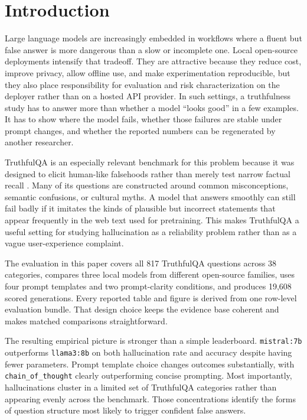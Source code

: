 \documentclass[conference]{IEEEtran}
\begin{document}
\section{\textbf{Introduction}}

Large language models are increasingly embedded in workflows where a fluent but false answer is more dangerous than a slow or incomplete one. Local open-source deployments intensify that tradeoff. They are attractive because they reduce cost, improve privacy, allow offline use, and make experimentation reproducible, but they also place responsibility for evaluation and risk characterization on the deployer rather than on a hosted API provider. In such settings, a truthfulness study has to answer more than whether a model ``looks good'' in a few examples. It has to show where the model fails, whether those failures are stable under prompt changes, and whether the reported numbers can be regenerated by another researcher.

TruthfulQA is an especially relevant benchmark for this problem because it was designed to elicit human-like falsehoods rather than merely test narrow factual recall \cite{truthfulqa}. Many of its questions are constructed around common misconceptions, semantic confusions, or cultural myths. A model that answers smoothly can still fail badly if it imitates the kinds of plausible but incorrect statements that appear frequently in the web text used for pretraining. This makes TruthfulQA a useful setting for studying hallucination as a reliability problem rather than as a vague user-experience complaint.

The evaluation in this paper covers all 817 TruthfulQA questions across 38 categories, compares three local models from different open-source families, uses four prompt templates and two prompt-clarity conditions, and produces 19,608 scored generations. Every reported table and figure is derived from one row-level evaluation bundle. That design choice keeps the evidence base coherent and makes matched comparisons straightforward.

The resulting empirical picture is stronger than a simple leaderboard. \texttt{mistral:7b} outperforms \texttt{llama3:8b} on both hallucination rate and accuracy despite having fewer parameters. Prompt template choice changes outcomes substantially, with \texttt{chain\_of\_thought} clearly outperforming concise prompting. Most importantly, hallucinations cluster in a limited set of TruthfulQA categories rather than appearing evenly across the benchmark. Those concentrations identify the forms of question structure most likely to trigger confident false answers.
\end{document}
